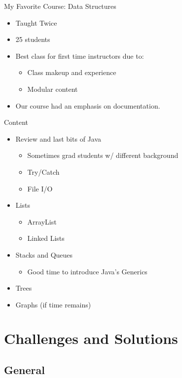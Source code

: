 \documentclass[11pt]{beamer}
\begin{document}
\begin{frame}{My Favorite Course: Data Structures}
	\begin{itemize}
		\item Taught Twice
		\item 25 students
		\item Best class for first time instructors due to:
		\begin{itemize}
			\item Class makeup and experience
			\item Modular content
		\end{itemize}
		\item Our course had an emphasis on documentation. 
	\end{itemize}
	
\end{frame}


\begin{frame}{Content}
	\begin{itemize}
		\item Review and last bits of Java
		
		\begin{itemize}
			\item Sometimes grad students w/ different background
			\item Try/Catch
			\item File I/O
		\end{itemize}
		\pause
		\item Lists
		\begin{itemize}
			\item ArrayList
			\item Linked Lists
		\end{itemize}
		\pause
		\item Stacks and Queues
		\begin{itemize}
			\item Good time to introduce Java's Generics
		\end{itemize}
		\pause
		\item Trees
		\pause
		\item Graphs (if time remains)
	\end{itemize}
\end{frame}

\section{Challenges and Solutions}

\subsection{General}
\end{document}
